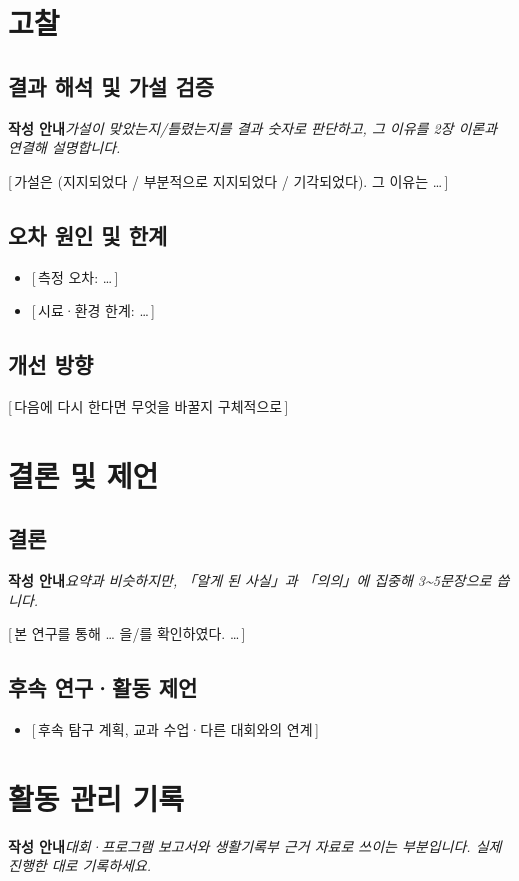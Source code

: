\documentclass[11pt,a4paper]{article}
\newcommand{\guide}[1]{\par{\small\color{leaf}\sffamily\bfseries 작성 안내\quad}{\small\color{mute}\itshape #1}\par\smallskip}
\newcommand{\ph}[1]{{\color{ph}[\,#1\,]}}
\begin{document}
\section{고찰}
\subsection{결과 해석 및 가설 검증}
\guide{가설이 맞았는지/틀렸는지를 결과 숫자로 판단하고, 그 이유를 2장 이론과 연결해 설명합니다.}
\ph{가설은 (지지되었다 / 부분적으로 지지되었다 / 기각되었다). 그 이유는 …}
\subsection{오차 원인 및 한계}
\begin{itemize}\item \ph{측정 오차: …}\item \ph{시료·환경 한계: …}\end{itemize}
\subsection{개선 방향}
\ph{다음에 다시 한다면 무엇을 바꿀지 구체적으로}

\section{결론 및 제언}
\subsection{결론}
\guide{요약과 비슷하지만, 「알게 된 사실」과 「의의」에 집중해 3\textasciitilde5문장으로 씁니다.}
\ph{본 연구를 통해 … 을/를 확인하였다. …}
\subsection{후속 연구·활동 제언}
\begin{itemize}\item \ph{후속 탐구 계획, 교과 수업·다른 대회와의 연계}\end{itemize}

\section{활동 관리 기록}
\guide{대회·프로그램 보고서와 생활기록부 근거 자료로 쓰이는 부분입니다. 실제 진행한 대로 기록하세요.}
\end{document}
